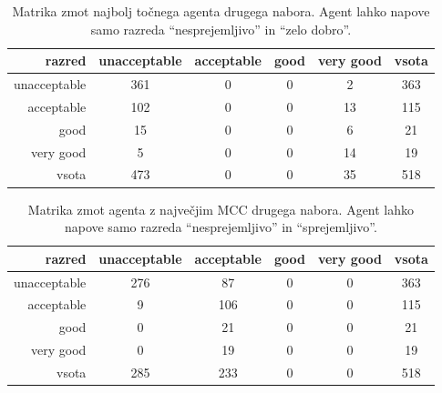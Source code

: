\begin{table}[H]
    \centering
    \caption{Matrika zmot najbolj točnega agenta drugega nabora. Agent lahko napove samo razreda \enquote{nesprejemljivo} in \enquote{zelo dobro}.}
    \begin{tabular}{||rccccc||}
        \hline
        razred       & unacceptable & acceptable & good & very good & vsota \\ \hline
        unacceptable & 361          & 0          & 0    & 2         & 363   \\ \hline
        acceptable   & 102          & 0          & 0    & 13        & 115   \\ \hline
        good         & 15           & 0          & 0    & 6         & 21    \\ \hline
        very good    & 5            & 0          & 0    & 14        & 19    \\ \hline
        vsota        & 473          & 0          & 0    & 35        & 518   \\ \hline
    \end{tabular}
    \label{tab:car_acc_2}
\end{table}

\begin{table}[H]
    \centering
    \caption{Matrika zmot agenta z največjim MCC drugega nabora. Agent lahko napove samo razreda \enquote{nesprejemljivo} in \enquote{sprejemljivo}.}
    \begin{tabular}{||rccccc||}
        \hline
        razred       & unacceptable & acceptable & good & very good & vsota \\ \hline
        unacceptable & 276          & 87         & 0    & 0         & 363   \\ \hline
        acceptable   & 9            & 106        & 0    & 0         & 115   \\ \hline
        good         & 0            & 21         & 0    & 0         & 21    \\ \hline
        very good    & 0            & 19         & 0    & 0         & 19    \\ \hline
        vsota        & 285          & 233        & 0    & 0         & 518   \\ \hline
    \end{tabular}
    \label{tab:car_mcc_2}
\end{table}

